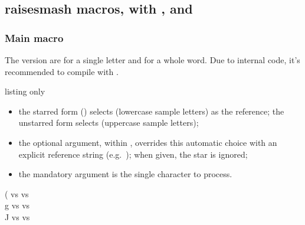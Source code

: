 \documentclass[11pt,a4paper]{ltxdoc}
\begin{document}
\pagebreak

\subsection{raisesmash macros, with , and }

\subsubsection{Main macro}

The  version are \ShowCode{\\raisesmashletter} for a single letter and \ShowCode{\\raisesmashtext} for a whole word. Due to internal code, it's recommended to compile with .

\begin{DemoCode}{listing only}

\def\sampleslettersminus{azeruosmwxcvn}         %
\def\sampleslettersmajus{AZERTUIOSDHKLMWXCVBN}  %
\end{DemoCode}

\begin{itemize}
  \item the starred form (\ShowCode{*}) selects \ShowCode{\\sampleslettersminus} (lowercase sample letters) as the reference; the unstarred form selects \ShowCode{\\sampleslettersmajus} (uppercase sample letters);
  \item the optional argument, within \ShowCode{[...]}, overrides this automatic choice with an explicit reference string (e.g.\ \ShowCode{[aeiou]}); when given, the star is ignored;
  \item the mandatory argument is the single character to process.
\end{itemize}

\begin{DemoCode}{}
{\LARGE\ttfamily ( vs \raisesmashletter{(} vs \raisesmashletter*{(}}\\
{\LARGE\ttfamily g vs  vs }\\
{\LARGE\ttfamily J vs  vs }
\end{DemoCode}
\end{document}
